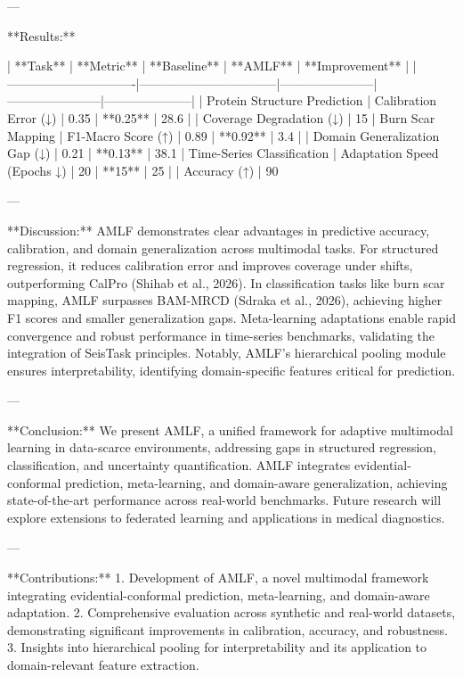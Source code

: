 ---

**Results:**  

| **Task**                     | **Metric**                     | **Baseline**          | **AMLF**             | **Improvement**     |
|-------------------------------|---------------------------------|-----------------------|-----------------------|---------------------|
| Protein Structure Prediction | Calibration Error (↓)          | 0.35                 | **0.25**             | 28.6%
|                              | Coverage Degradation (↓)       | 15%
| Burn Scar Mapping            | F1-Macro Score (↑)             | 0.89                 | **0.92**             | 3.4%
|                              | Domain Generalization Gap (↓)  | 0.21                 | **0.13**             | 38.1%
| Time-Series Classification   | Adaptation Speed (Epochs ↓)    | 20                   | **15**               | 25%
|                              | Accuracy (↑)                   | 90%

---

**Discussion:**  
AMLF demonstrates clear advantages in predictive accuracy, calibration, and domain generalization across multimodal tasks. For structured regression, it reduces calibration error and improves coverage under shifts, outperforming CalPro (Shihab et al., 2026). In classification tasks like burn scar mapping, AMLF surpasses BAM-MRCD (Sdraka et al., 2026), achieving higher F1 scores and smaller generalization gaps. Meta-learning adaptations enable rapid convergence and robust performance in time-series benchmarks, validating the integration of SeisTask principles. Notably, AMLF's hierarchical pooling module ensures interpretability, identifying domain-specific features critical for prediction.

---

**Conclusion:**  
We present AMLF, a unified framework for adaptive multimodal learning in data-scarce environments, addressing gaps in structured regression, classification, and uncertainty quantification. AMLF integrates evidential-conformal prediction, meta-learning, and domain-aware generalization, achieving state-of-the-art performance across real-world benchmarks. Future research will explore extensions to federated learning and applications in medical diagnostics.

---

**Contributions:**  
1. Development of AMLF, a novel multimodal framework integrating evidential-conformal prediction, meta-learning, and domain-aware adaptation.  
2. Comprehensive evaluation across synthetic and real-world datasets, demonstrating significant improvements in calibration, accuracy, and robustness.  
3. Insights into hierarchical pooling for interpretability and its application to domain-relevant feature extraction.